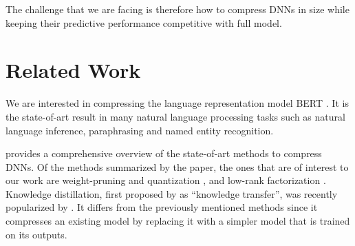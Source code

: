 \documentclass[10pt]{article}
\begin{document}
The challenge that we are facing is therefore how to compress DNNs in size
while keeping their predictive performance competitive with full model.


\section{Related Work}


We are interested in compressing the language representation model BERT
\citep{devlin2018bert}.  It is the state-of-art result in many natural
language processing tasks  such as natural language inference, paraphrasing
and named entity recognition.

\citet{cheng2017survey} provides a comprehensive overview of the state-of-art
methods to compress DNNs. Of the methods summarized by the paper, the ones
that are of interest to our work are weight-pruning and quantization
\citep{han2015deep}, and low-rank factorization \citep{denton2014exploiting}.
Knowledge distillation, first proposed by \citep{bucilua2006model} as
``knowledge transfer'', was recently popularized by
\citep{hinton2015distilling}. It differs from the previously mentioned methods
since it compresses an existing model by replacing it with a simpler model
that is trained on its outputs.
\end{document}
